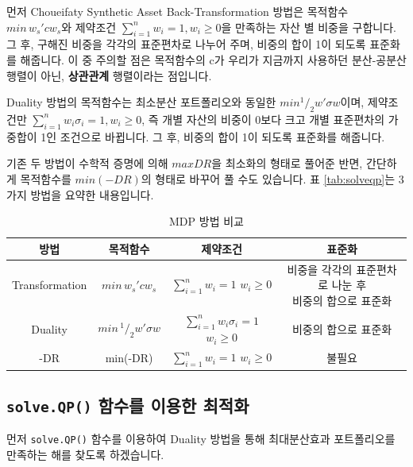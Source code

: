 \documentclass[12pt,]{book}
\begin{document}
먼저 Choueifaty Synthetic Asset Back-Transformation 방법은 목적함수 \(min\,w_s'cw_s\)와 제약조건 \(\sum_{i=1}^n w_i = 1, w_i \ge 0\)을 만족하는 자산 별 비중을 구합니다. 그 후, 구해진 비중을 각각의 표준편차로 나누어 주며, 비중의 합이 1이 되도록 표준화를 해줍니다. 이 중 주의할 점은 목적함수의 c가 우리가 지금까지 사용하던 분산-공분산 행렬이 아닌, \textbf{상관관계} 행렬이라는 점입니다.

Duality 방법의 목적함수는 최소분산 포트폴리오와 동일한 \(min^1/_2w'\sigma w\)이며, 제약조건만 \(\sum_{i=1}^n w_i \sigma_i = 1, w_i \ge 0\), 즉 개별 자산의 비중이 0보다 크고 개별 표준편차의 가중합이 1인 조건으로 바뀝니다. 그 후, 비중의 합이 1이 되도록 표준화를 해줍니다.

기존 두 방법이 수학적 증명에 의해 \(maxDR\)을 최소화의 형태로 풀어준 반면, 간단하게 목적함수를 \(min(-DR)\)의 형태로 바꾸어 풀 수도 있습니다. 표 \ref{tab:solveqp}는 3가지 방법을 요약한 내용입니다.

\begin{table}[!h]

\caption{\label{tab:mdp}MDP 방법 비교}
\centering
\fontsize{8}{10}\selectfont
\begin{tabular}{cccc}
\toprule
방법 & 목적함수 & 제약조건 & 표준화\\
\midrule
\rowcolor{gray!6}  Transformation & $min\,w_s'cw_s$ & \makecell[l]{$\sum_{i=1}^n w_i = 1$ \\ $w_i \ge 0$} & \makecell[l]{비중을 각각의 표준편차로 나눈 후 \\ 비중의 합으로 표준화}\\
Duality & $min\,^1/_2w'\sigma w$ & \makecell[l]{$\sum_{i=1}^n w_i \sigma_i = 1$ \\ $w_i \ge 0$} & 비중의 합으로 표준화\\
\rowcolor{gray!6}  -DR & min(-DR) & \makecell[l]{$\sum_{i=1}^n w_i = 1$ \\ $w_i \ge0$} & 불필요\\
\bottomrule
\end{tabular}
\end{table}

\hypertarget{solve.qp----1}{%
\subsection{\texorpdfstring{\texttt{solve.QP()} 함수를 이용한 최적화}{solve.QP() 함수를 이용한 최적화}}\label{solve.qp----1}}

먼저 \texttt{solve.QP()} 함수를 이용하여 Duality 방법을 통해 최대분산효과 포트폴리오를 만족하는 해를 찾도록 하겠습니다.
\end{document}
